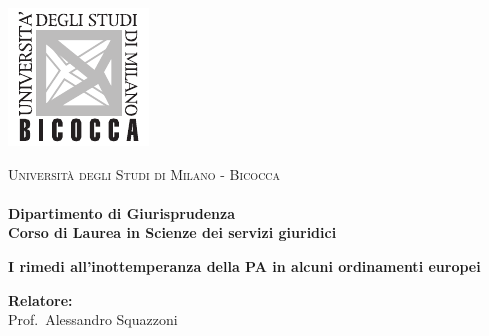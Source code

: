 \documentclass[12pt,it,a4paper,]{report}
\begin{document}
    \begin{titlepage}
        
        \noindent
        \begin{minipage}[t]{0.19\textwidth}{
            \vspace{-4mm}
            {\includegraphics[scale=1.15]{style/univ_logo.pdf}}
          }
        \end{minipage}
        \hspace{0.5cm}
        \begin{minipage}[t]{1.81\textwidth}
        {
          {\textsc{Università degli Studi di Milano - Bicocca}} \\
          \textbf{} \\
          \textbf{Dipartimento di Giurisprudenza} \\
          \textbf{Corso di Laurea in Scienze dei servizi giuridici} \\
          \par
        }
        \end{minipage}
        
	\vspace{20mm}
        
	\begin{center}
            {\LARGE{
                    \textbf{I rimedi all'inottemperanza della PA in
alcuni ordinamenti europei}
                    \par
            }}
        \end{center}
        
        \vspace{30mm}

        \noindent
        {\large \textbf{Relatore:} \\ Prof.~Alessandro Squazzoni } \\

        \vspace{15mm}


\end{titlepage}
\end{document}
